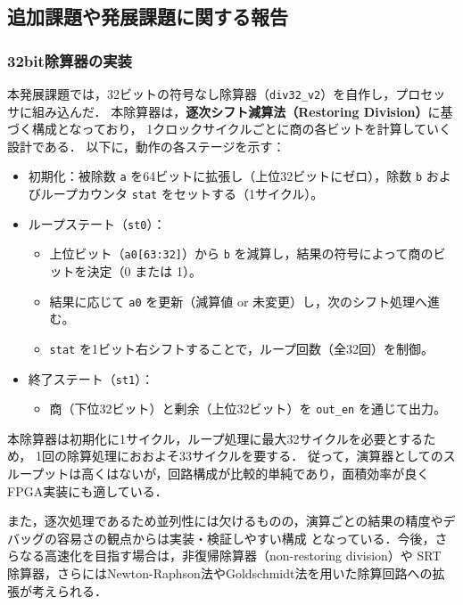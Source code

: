 \documentclass[autodetect-engine,dvi=dvipdfmx,ja=standard,
               a4j,11pt]{bxjsarticle}
\begin{document}
     
\subsection{追加課題や発展課題に関する報告}\label{tuika_hatten}
\subsubsection{32bit除算器の実装}\label{div}
本発展課題では，32ビットの符号なし除算器（\texttt{div32\_v2}）を自作し，プロセッサに組み込んだ．
本除算器は，\textbf{逐次シフト減算法（Restoring Division）}に基づく構成となっており，
1クロックサイクルごとに商の各ビットを計算していく設計である．
以下に，動作の各ステージを示す：

\begin{itemize}
  \item 初期化：被除数 \texttt{a} を64ビットに拡張し（上位32ビットにゼロ），除数 \texttt{b} およびループカウンタ \texttt{stat} をセットする（1サイクル）。
  \item ループステート（\texttt{st0}）：
  \begin{itemize}
    \item 上位ビット（\texttt{a0[63:32]}）から \texttt{b} を減算し，結果の符号によって商のビットを決定（0 または 1）。
    \item 結果に応じて \texttt{a0} を更新（減算値 or 未変更）し，次のシフト処理へ進む。
    \item \texttt{stat} を1ビット右シフトすることで，ループ回数（全32回）を制御。
  \end{itemize}
  \item 終了ステート（\texttt{st1}）：
  \begin{itemize}
    \item 商（下位32ビット）と剰余（上位32ビット）を \texttt{out\_en} を通じて出力。
  \end{itemize}
\end{itemize}
本除算器は初期化に1サイクル，ループ処理に最大32サイクルを必要とするため，
1回の除算処理におおよそ33サイクルを要する．
従って，演算器としてのスループットは高くはないが，回路構成が比較的単純であり，面積効率が良くFPGA実装にも適している．

また，逐次処理であるため並列性には欠けるものの，演算ごとの結果の精度やデバッグの容易さの観点からは実装・検証しやすい構成
となっている．今後，さらなる高速化を目指す場合は，非復帰除算器（non-restoring division）や 
SRT 除算器，さらにはNewton-Raphson法やGoldschmidt法を用いた除算回路への拡張が考えられる．
\end{document}
